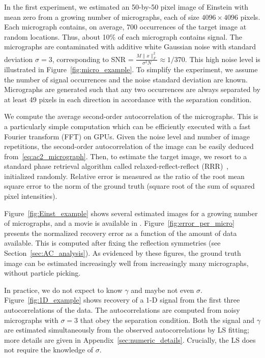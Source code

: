 \documentclass[9pt,twocolumn,twoside,lineno]{pnas-new}
\begin{document}
In the first experiment, we estimated 
an 50-by-50 pixel image of Einstein with mean zero from a growing number of micrographs, each of size $4096\times 4096$ pixels. Each micrograph contains, on average, 700 occurrences of the target image at random locations. 
Thus, about 10\% of each micrograph contains signal. The micrographs are contaminated with additive white Gaussian noise with standard deviation $\sigma=3$,  corresponding  to SNR = $\frac{M\|x\|_F^2} {\sigma^2N} \approx1/370$. This high noise level is illustrated in Figure~\ref{fig:micro_example}. 
To simplify the experiment, we assume the number of signal occurrences and the noise standard deviation are known. Micrographs are generated such that any two occurrences are always separated by at least 49 pixels in each direction in accordance with the separation condition. %

We compute the average second-order autocorrelation of the micrographs. This is a particularly simple computation which can be efficiently executed with a fast Fourier transform (FFT) on GPUs. Given the noise level and number of image repetitions, the second-order autocorrelation of the image can be easily deduced from~\eqref{eq:ac2_micrograph}.  Then, to estimate the target image, we resort to a standard phase retrieval algorithm called relaxed-reflect-reflect (RRR)~\cite{elser2017rrr}, initialized randomly.
Relative error is measured as the ratio of the root mean square error to the norm of the ground truth (square root of the sum of squared pixel intensities).

Figure~\ref{fig:Einst_example} shows several estimated images for a growing number of micrographs, and a movie is available in . Figure~\ref{fig:error_per_micro} presents the normalized recovery error as a function of the amount of data available.  This is computed after fixing the reflection symmetries (see Section~\ref{sec:AC_analysis}). As evidenced by these figures, the ground truth image can be estimated increasingly well from increasingly many micrographs, without particle picking.

In practice, we do not expect to know $\gamma$ and maybe not even $\sigma$.
Figure~\ref{fig:1D_example} shows recovery of a 1-D signal from the first three autocorrelations of the data.
The autocorrelations are computed from noisy micrographs with $\sigma=3$ that obey the separation condition.%
 Both the signal  and $\gamma$ are estimated simultaneously from the observed autocorrelations by LS fitting; more details are given in Appendix~\ref{sec:numeric_details}. Crucially, the LS does not require the knowledge of $\sigma$. 
\end{document}
